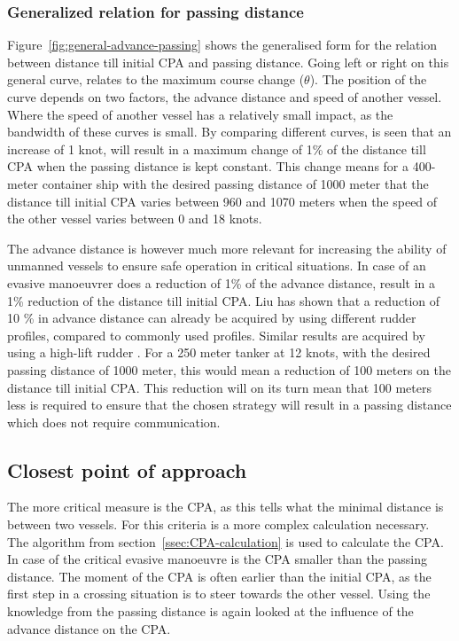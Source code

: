 \subsubsection{Generalized relation for passing distance}
Figure~\ref{fig:general-advance-passing} shows the generalised form for the relation between distance till initial CPA and passing distance.
Going left or right on this general curve, relates to the maximum course change ($\theta$). The position of the curve depends on two factors, the advance distance and speed of another vessel. Where the speed of another vessel has a relatively small impact, as the bandwidth of these curves is small. By comparing different curves, is seen that an increase of 1 knot, will result in a maximum change of 1\% of the distance till \ac{CPA} when the passing distance is kept constant. This change means for a 400-meter container ship with the desired passing distance of 1000 meter that the distance till initial CPA varies between 960 and 1070 meters when the speed of the other vessel varies between 0 and 18 knots.

\clearpage

The advance distance is however much more relevant for increasing the ability of unmanned vessels to ensure safe operation in critical situations. In case of an evasive manoeuvrer does a reduction of 1\% of the advance distance, result in a 1\% reduction of the distance till initial CPA.
Liu \cite{Liu2015a} has shown that a reduction of 10 \% in advance distance can already be acquired by using different rudder profiles, compared to commonly used profiles. Similar results are acquired by using a high-lift rudder \cite{Zaky2018}. For a 250 meter tanker at 12 knots, with the desired passing distance of 1000 meter, this would mean a reduction of 100 meters on the distance till initial CPA. This reduction will on its turn mean that 100 meters less is required to ensure that the chosen strategy will result in a passing distance which does not require communication.

\subsection{Closest point of approach}
The more critical measure is the \ac{CPA}, as this tells what the minimal distance is between two vessels. For this criteria is a more complex calculation necessary. The algorithm from section~\ref{ssec:CPA-calculation} is used to calculate the CPA. In case of the critical evasive manoeuvre is the CPA smaller than the passing distance. The moment of the \ac{CPA} is often earlier than the initial CPA, as the first step in a crossing situation is to steer towards the other vessel. Using the knowledge from the passing distance is again looked at the influence of the advance distance on the CPA.


